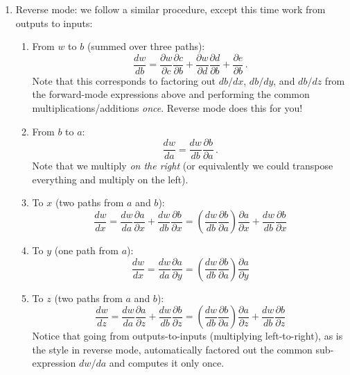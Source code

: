 \documentclass[10pt,oneside]{article}
\begin{document}
\begin{enumerate}
\item Reverse mode: we follow a similar procedure, except this time work from outputs to inputs:

\begin{enumerate}
    \item From $w$ to $b$ (summed over three paths):
    $$
    \frac{dw}{db} = \frac{\partial w}{\partial c} \frac{\partial c}{\partial b} + \frac{\partial w}{\partial d} \frac{\partial d}{\partial b} + \frac{\partial e}{\partial b} \, .
    $$
    Note that this corresponds to factoring out $db/dx$, $db/dy$, and $db/dz$ from the forward-mode expressions above and performing the common multiplications/additions \emph{once}.  Reverse mode does this for you!

    \item From $b$ to $a$: $$\frac{dw}{da} = \frac{d w}{d b} \frac{\partial b}{\partial a} \, .$$ Note that we multiply \emph{on the right} (or equivalently we could transpose everything and multiply on the left).

    \item To $x$ (two paths from $a$ and $b$):
    $$
    \frac{dw}{dx} = \frac{dw}{da} \frac{\partial a}{\partial x} + \frac{dw}{db} \frac{\partial b}{\partial x} =  \left( \frac{d w}{d b} \frac{\partial b}{\partial a} \right) \frac{\partial a}{\partial x} + \frac{dw}{db} \frac{\partial b}{\partial x}
    $$
    
    \item To $y$ (one path from $a$):
    $$
    \frac{dw}{dx} = \frac{dw}{da} \frac{\partial a}{\partial y} = \left( \frac{d w}{d b} \frac{\partial b}{\partial a} \right) \frac{\partial a}{\partial y}
    $$
    
    \item To $z$ (two paths from $a$ and $b$):
    $$
    \frac{dw}{dz} = \frac{dw}{da} \frac{\partial a}{\partial z} + \frac{dw}{db} \frac{\partial b}{\partial z} = \left( \frac{d w}{d b} \frac{\partial b}{\partial a} \right) \frac{\partial a}{\partial z} + \frac{dw}{db} \frac{\partial b}{\partial z}
    $$
    Notice that going from outputs-to-inputs (multiplying left-to-right), as is the style in reverse mode, automatically factored out the common sub-expression $dw/da$ and computes it only once.
\end{enumerate}

\end{enumerate}
\end{document}

